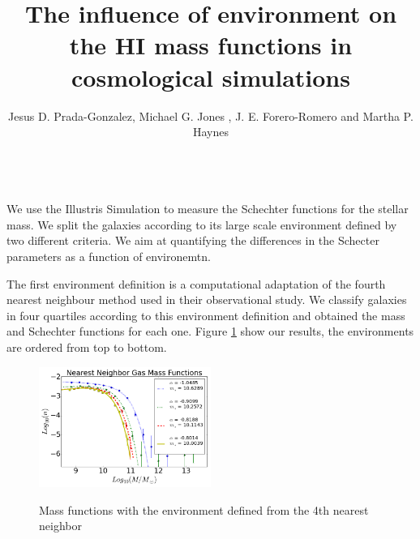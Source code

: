 \documentclass[preprint,proceedings]{rmaa}
\title{The influence of environment on the HI mass functions in cosmological simulations}
\author{Jesus D. Prada-Gonzalez\altaffilmark{1}, Michael G. Jones \altaffilmark{2}, J. E. Forero-Romero\altaffilmark{1} and Martha P. Haynes \altaffilmark{2}}
\begin{document}
\maketitle 


\\

We use the Illustris Simulation \citep{Vogelsberger}
to measure the Schechter functions for the stellar mass.
We split the galaxies according to its large scale environment
defined by two different criteria.
We aim at quantifying the differences in the Schecter parameters as a
function of environemtn.

The first environment definition is a computational
adaptation of the fourth nearest neighbour method used \citet{Jones}
in their observational study. 
We classify galaxies in four quartiles according to this environment
definition and obtained the mass and Schechter functions for each
one. Figure \ref{fig1} show our results, the environments are ordered
from top to bottom.


\begin{figure}[h!]
\centering
\includegraphics[width=0.5\textwidth]{environment1}
\label{fig1}
\caption{Mass functions with the environment defined from the 4th
  nearest neighbor}
\centering
\end{figure}
\end{document}
